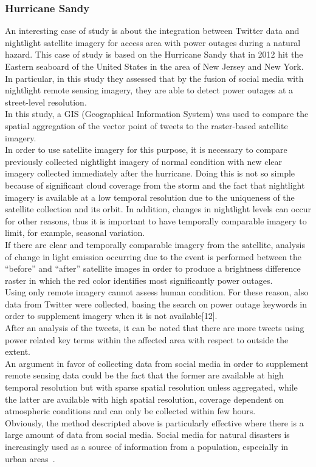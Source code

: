 \subsubsection{Hurricane Sandy}
\noindent An interesting case of study is about the integration between Twitter data and nightlight satellite imagery for access area with power outages during a natural hazard. This case of study is based on the Hurricane Sandy that in 2012 hit the Eastern seaboard of the United States in the area of New Jersey and New York. In particular, in this study they assessed that by the fusion of social media with nightlight remote sensing imagery, they are able to detect power outages at a street-level resolution. 
\\
In this study, a GIS (Geographical Information System) was used to compare the spatial aggregation of the vector point of tweets to the raster-based satellite imagery.
\\
In order to use satellite imagery for this purpose, it is necessary to compare previously collected nightlight imagery of normal condition with new clear imagery collected immediately after the hurricane. Doing this is not so simple because of significant cloud coverage from the storm and the fact that nightlight imagery is available at a low temporal resolution due to the uniqueness of the satellite collection and its orbit. In addition, changes in nightlight levels can occur for other reasons, thus it is important to have temporally comparable imagery to limit, for example, seasonal variation.
\\
If there are clear and temporally comparable imagery from the satellite, analysis of change in light emission occurring due to the event is performed between the ``before'' and ``after'' satellite images in order to produce a brightness difference raster in which the red color identifies most significantly power outages.
\\
Using only remote imagery cannot assess human condition. For these reason, also data from Twitter were collected, basing the search on power outage keywords in order to supplement imagery when it is not available[12].
\\
After an analysis of the tweets, it can be noted that there are more tweets using power related key terms within the affected area with respect to outside the extent.
\\
An argument in favor of collecting data from social media in order to supplement remote sensing data could be the fact that the former are available at high temporal resolution but with sparse spatial resolution unless aggregated, while the latter are available with high spatial resolution, coverage dependent on atmospheric conditions and can only be collected within few hours.
\\
Obviously, the method descripted above is particularly effective where there is a large amount of data from social media. Social media for natural disasters is increasingly used as a source of information from a population, especially in urban areas~\cite{hurricanesandy}.

